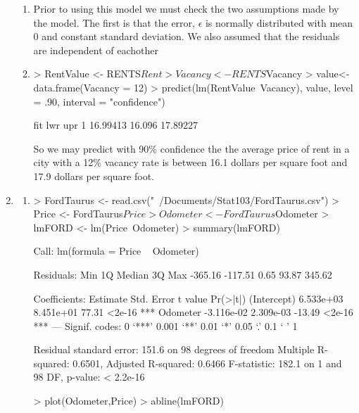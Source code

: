 \documentclass{article}
\begin{document}
\begin{enumerate}
\begin{enumerate}[a]
\item Prior to using this model we must check the two assumptions made by the model. The first is that the error, $\epsilon$ is normally distributed with mean 0 and constant standard deviation. We also assumed that the residuals are independent of eachother

\item

\begin{Schunk}
\begin{Sinput}
> RentValue <- RENTS$Rent
> Vacancy <- RENTS$Vacancy
> value<-data.frame(Vacancy = 12)
> predict(lm(RentValue~Vacancy), value, level = .90, interval = "confidence")
\end{Sinput}
\begin{Soutput}
       fit    lwr      upr
1 16.99413 16.096 17.89227
\end{Soutput}
\end{Schunk}
So we may predict with 90\% confidence the the average price of rent in a city with a 12\% vacancy rate is between 16.1 dollars per square foot and 17.9 dollars per square foot.
\end{enumerate}
\item

\begin{enumerate}[a]
\item 
\begin{Schunk}
\begin{Sinput}
> FordTaurus <- read.csv("~/Documents/Stat103/FordTaurus.csv")
> Price <- FordTaurus$Price
> Odometer <- FordTaurus$Odometer
> lmFORD <- lm(Price~Odometer)
> summary(lmFORD)
\end{Sinput}
\begin{Soutput}
Call:
lm(formula = Price ~ Odometer)

Residuals:
    Min      1Q  Median      3Q     Max 
-365.16 -117.51    0.65   93.87  345.62 

Coefficients:
              Estimate Std. Error t value Pr(>|t|)    
(Intercept)  6.533e+03  8.451e+01   77.31   <2e-16 ***
Odometer    -3.116e-02  2.309e-03  -13.49   <2e-16 ***
---
Signif. codes:  0 ‘***’ 0.001 ‘**’ 0.01 ‘*’ 0.05 ‘.’ 0.1 ‘ ’ 1

Residual standard error: 151.6 on 98 degrees of freedom
Multiple R-squared:  0.6501,	Adjusted R-squared:  0.6466 
F-statistic: 182.1 on 1 and 98 DF,  p-value: < 2.2e-16
\end{Soutput}
\begin{Sinput}
> plot(Odometer,Price)
> abline(lmFORD)
\end{Sinput}
\end{Schunk}




\end{enumerate}
\end{enumerate}
\end{document}
